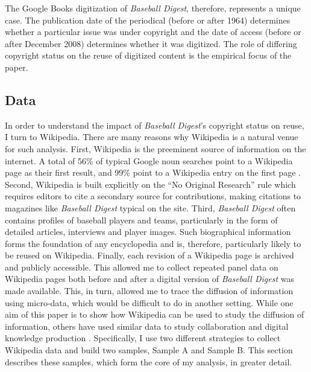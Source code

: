 \documentclass[11pt]{article}
\begin{document}
The Google Books digitization of \emph{Baseball Digest}, therefore, represents a unique case. The publication date of the periodical (before or after 1964) determines whether a particular issue was under copyright and the date of access (before or after December 2008) determines whether it was digitized. The role of differing copyright status on the reuse of digitized content is the empirical focus of the paper. 

\subsection{Data}
\label{sec:data}

In order to understand the impact of \emph{Baseball Digest}'s copyright status on reuse, I turn to Wikipedia. There are many reasons why Wikipedia is a natural venue for such analysis. First, Wikipedia is the preeminent source of information on the internet. A total of 56\% of typical Google noun searches point to a Wikipedia page as their first result, and 99\% point to a Wikipedia entry on the first page \citep{silverwood-cope_wikipedia:_2012}. Second, Wikipedia is built explicitly on the ``No Original Research'' rule which requires editors to cite a secondary source for contributions, making citations to magazines like \emph{Baseball Digest} typical on the site. Third, \emph{Baseball Digest} often contains profiles of baseball players and teams, particularly in the form of detailed articles, interviews and player images. Such biographical information forms the foundation of any encyclopedia \citep{greenstein_experts_2014} and is, therefore, particularly likely to be reused on Wikipedia. Finally, each revision of a Wikipedia page is archived and publicly accessible. This allowed me to collect repeated panel data on Wikipedia pages both before and after a digital version of \emph{Baseball Digest} was made available. This, in turn, allowed me to trace the diffusion of information using micro-data, which would be difficult to do in another setting. While one aim of this paper is to show how Wikipedia can be used to study the diffusion of information, others have used similar data to study collaboration and digital knowledge production \citep{zhang_group_2010, greenstein_is_2012, nagaraj_wiki-pages_2009, algan_cooperation_2013, gorbatai_social_2012, aaltonen_cumulative_2013}. Specifically, I use two different strategies to collect Wikipedia data and build two samples, Sample A and Sample B. This section describes these samples, which form the core of my analysis, in greater detail.
\end{document}

